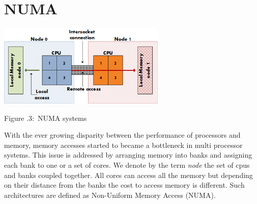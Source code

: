 \documentclass[twoside]{article}
\newcounter{lecnum}
\newcommand{\fig}[3]{
            \vspace{#2}
            \begin{center}
            Figure \thelecnum.#1:~#3
            \end{center}
    }
\begin{document}
\section{NUMA}

\begin{center}
  \includegraphics[width=0.6\textwidth]{numa.png}
  \fig{3}{0 pt}{NUMA systems}
\end{center}

With the ever growing disparity between the performance of processors and
memory, memory accesses started to became a bottleneck in multi processor
systems. This issue is addressed by arranging memory into banks and assigning
each bank to one or a set of cores. We denote by the term \textit{node} the
set of cpus and banks coupled together. All cores can access all the memory but
depending on their distance from the banks the cost to access memory is
different. Such architectures are defined as Non-Uniform Memory Access
(NUMA).

\newpage


\end{document}
